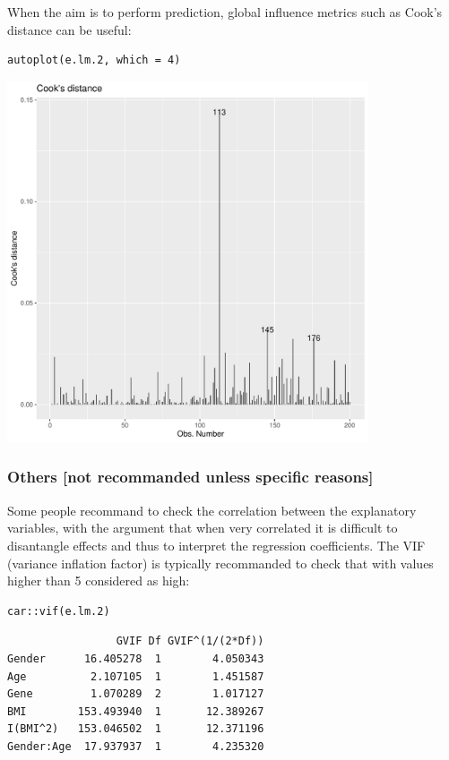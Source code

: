 \documentclass[12pt]{article}
\begin{document}
When the aim is to perform prediction, global influence metrics such
as Cook's distance can be useful:
\lstset{language=r,label= ,caption= ,captionpos=b,numbers=none}
\begin{lstlisting}
autoplot(e.lm.2, which = 4)
\end{lstlisting}

\begin{center}
\includegraphics[width=0.8\textwidth]{./figures/A5-cook.pdf}
\end{center}


\subsubsection{Others [not recommanded unless specific reasons]}
\label{sec:org970337f}
Some people recommand to check the correlation between the explanatory
variables, with the argument that when very correlated it is difficult
to disantangle effects and thus to interpret the regression
coefficients. The VIF (variance inflation factor) is typically
recommanded to check that with values higher than 5 considered as
high:

\lstset{language=r,label= ,caption= ,captionpos=b,numbers=none}
\begin{lstlisting}
car::vif(e.lm.2)
\end{lstlisting}

\begin{verbatim}
                 GVIF Df GVIF^(1/(2*Df))
Gender      16.405278  1        4.050343
Age          2.107105  1        1.451587
Gene         1.070289  2        1.017127
BMI        153.493940  1       12.389267
I(BMI^2)   153.046502  1       12.371196
Gender:Age  17.937937  1        4.235320
\end{verbatim}
\end{document}
